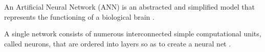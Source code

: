 
An Artificial Neural Network (ANN) is an abstracted and simplified model that represents the functioning of a biological brain \cite{mcculloch1943logical}. 


A single network consists of numerous interconnected simple computational units, called neurons, that are ordered into layers so as to create a neural net \cite{RefWorks:31}.



